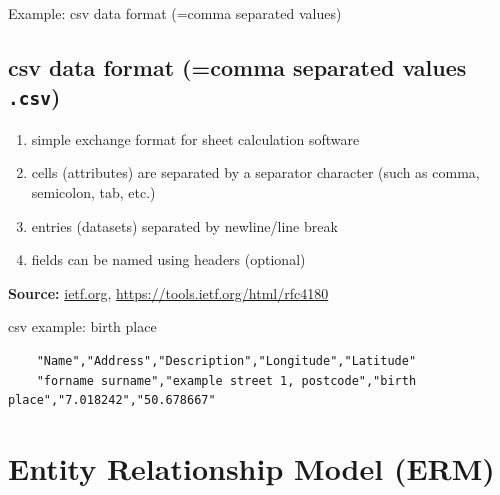 \begin{frame}[fragile]{Example: csv data format (=comma separated values)}
\subsection{csv data format (=comma separated values \texttt{.csv})}
    \begin{enumerate}
        \item simple exchange format for sheet calculation software 
        \item cells (attributes) are separated by a separator character (such as comma, semicolon, tab, etc.)
        \item entries (datasets) separated by newline/line break
        \item fields can be named using headers (optional)
    \end{enumerate}
    \textbf{Source:} \protect\url{ietf.org}, \protect\url{https://tools.ietf.org/html/rfc4180}
    
    \begin{block}{csv example: birth place}\scriptsize
    \begin{verbatim}
    "Name","Address","Description","Longitude","Latitude"
    "forname surname","example street 1, postcode","birth place","7.018242","50.678667"
    \end{verbatim}
    \end{block}
\end{frame}



\section{Entity Relationship Model (ERM)}

